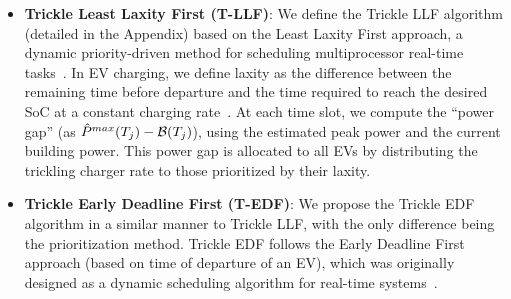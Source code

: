 \begin{itemize}[leftmargin=*]
\item \textbf{Trickle Least Laxity First (T-LLF)}: We define the Trickle LLF algorithm (detailed in the Appendix) based on the Least Laxity First approach, a dynamic priority-driven method for scheduling multiprocessor real-time tasks~\cite{leung1989new}. 
In EV charging, we define laxity as the difference between the remaining time before departure and the time required to reach the desired SoC at a constant charging rate~\cite{xu2016dynamic}. 
At each time slot, we compute the ``power gap'' (as $\hat{P}^{max}(T_j) - \mathcal{B}(T_j)$), using the estimated peak power and the current building power.
This power gap is allocated to all EVs by distributing the trickling charger rate %
to those prioritized by their laxity. 
%     
\item {\bf Trickle Early Deadline First (T-EDF)}: We propose the Trickle EDF algorithm in a similar manner to Trickle LLF, with the only difference being the prioritization method. Trickle EDF follows the Early Deadline First approach (based on time of departure of an EV), which was originally designed as a dynamic scheduling algorithm for real-time systems~\cite{stankovic_EDF}. 

\end{itemize}

